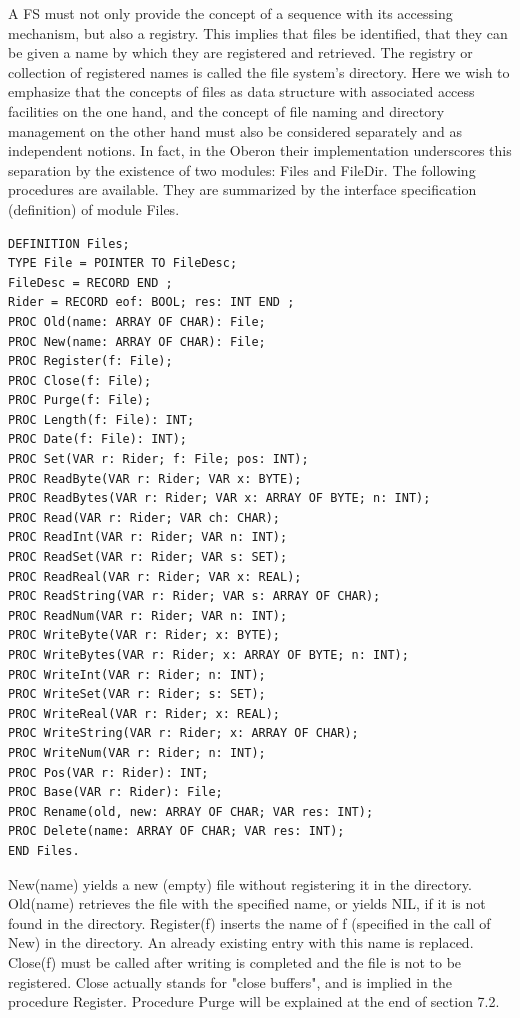 A FS must not only provide the concept of a sequence with its accessing mechanism, but
also a registry. This implies that files be identified, that they can be given a name by which they
are registered and retrieved. The registry or collection of registered names is called the file
system's directory. Here we wish to emphasize that the concepts of files as data structure with
associated access facilities on the one hand, and the concept of file naming and directory
management on the other hand must also be considered separately and as independent notions.
In fact, in the Oberon their implementation underscores this separation by the existence
of two modules: Files and FileDir. The following procedures are available. They are summarized
by the interface specification (definition) of module Files.
\begin{verbatim}
DEFINITION Files;
TYPE File = POINTER TO FileDesc;
FileDesc = RECORD END ;
Rider = RECORD eof: BOOL; res: INT END ;
PROC Old(name: ARRAY OF CHAR): File;
PROC New(name: ARRAY OF CHAR): File;
PROC Register(f: File);
PROC Close(f: File);
PROC Purge(f: File);
PROC Length(f: File): INT;
PROC Date(f: File): INT);
PROC Set(VAR r: Rider; f: File; pos: INT);
PROC ReadByte(VAR r: Rider; VAR x: BYTE);
PROC ReadBytes(VAR r: Rider; VAR x: ARRAY OF BYTE; n: INT);
PROC Read(VAR r: Rider; VAR ch: CHAR);
PROC ReadInt(VAR r: Rider; VAR n: INT);
PROC ReadSet(VAR r: Rider; VAR s: SET);
PROC ReadReal(VAR r: Rider; VAR x: REAL);
PROC ReadString(VAR r: Rider; VAR s: ARRAY OF CHAR);
PROC ReadNum(VAR r: Rider; VAR n: INT);
PROC WriteByte(VAR r: Rider; x: BYTE);
PROC WriteBytes(VAR r: Rider; x: ARRAY OF BYTE; n: INT);
PROC WriteInt(VAR r: Rider; n: INT);
PROC WriteSet(VAR r: Rider; s: SET);
PROC WriteReal(VAR r: Rider; x: REAL);
PROC WriteString(VAR r: Rider; x: ARRAY OF CHAR);
PROC WriteNum(VAR r: Rider; n: INT);
PROC Pos(VAR r: Rider): INT;
PROC Base(VAR r: Rider): File;
PROC Rename(old, new: ARRAY OF CHAR; VAR res: INT);
PROC Delete(name: ARRAY OF CHAR; VAR res: INT);
END Files.
\end{verbatim}

New(name) yields a new (empty) file without registering it in the directory. Old(name) retrieves
the file with the specified name, or yields NIL, if it is not found in the directory. Register(f) inserts
the name of f (specified in the call of New) in the directory. An already existing entry with this
name is replaced. Close(f) must be called after writing is completed and the file is not to be
registered. Close actually stands for "close buffers", and is implied in the procedure Register.
Procedure Purge will be explained at the end of section 7.2.

